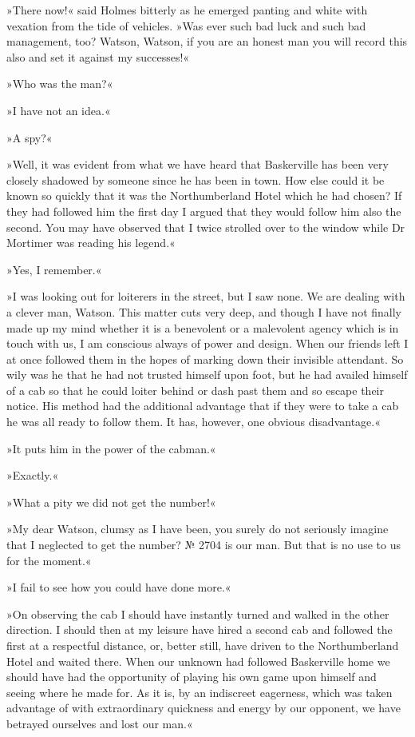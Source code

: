 »There now!« said Holmes bitterly as he emerged panting and white with vexation from the tide of vehicles. »Was ever such bad luck and such bad management, too? Watson, Watson, if you are an honest man you will record this also and set it against my successes!«

»Who was the man?«

»I have not an idea.«

»A spy?«

»Well, it was evident from what we have heard that Baskerville has been very closely shadowed by someone since he has been in town. How else could it be known so quickly that it was the Northumberland Hotel which he had chosen? If they had followed him the first day I argued that they would follow him also the second. You may have observed that I twice strolled over to the window while Dr Mortimer was reading his legend.«

»Yes, I remember.«

»I was looking out for loiterers in the street, but I saw none. We are dealing with a clever man, Watson. This matter cuts very deep, and though I have not finally made up my mind whether it is a benevolent or a malevolent agency which is in touch with us, I am conscious always of power and design. When our friends left I at once followed them in the hopes of marking down their invisible attendant. So wily was he that he had not trusted himself upon foot, but he had availed himself of a cab so that he could loiter behind or dash past them and so escape their notice. His method had the additional advantage that if they were to take a cab he was all ready to follow them. It has, however, one obvious disadvantage.«

»It puts him in the power of the cabman.«

»Exactly.«

»What a pity we did not get the number!«

»My dear Watson, clumsy as I have been, you surely do not seriously imagine that I neglected to get the number? № 2704 is our man. But that is no use to us for the moment.«

»I fail to see how you could have done more.«

»On observing the cab I should have instantly turned and walked in the other direction. I should then at my leisure have hired a second cab and followed the first at a respectful distance, or, better still, have driven to the Northumberland Hotel and waited there. When our unknown had followed Baskerville home we should have had the opportunity of playing his own game upon himself and seeing where he made for. As it is, by an indiscreet eagerness, which was taken advantage of with extraordinary quickness and energy by our opponent, we have betrayed ourselves and lost our man.«

